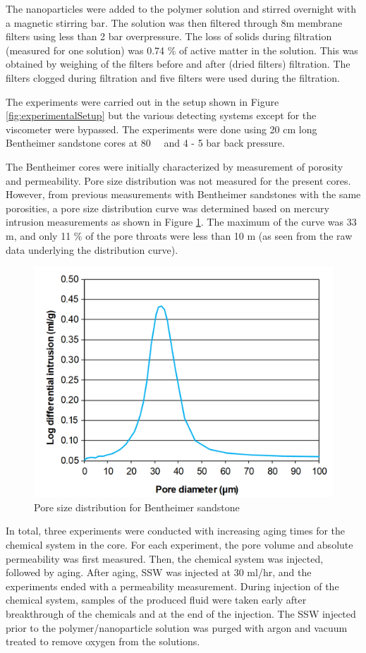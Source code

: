 The nanoparticles  were added to the polymer solution and stirred overnight with a magnetic stirring bar. The solution was then filtered through 8\micro m membrane filters using less than 2 bar overpressure. The loss of solids during filtration (measured for one solution) was 0.74 \% of active matter in the solution. This was obtained by weighing of the filters before and after (dried filters) filtration. The filters clogged during filtration and five filters were used during the filtration.

The experiments were carried out in the setup shown in Figure \ref{fig:experimentalSetup} but the various detecting systems except for the viscometer were bypassed. The experiments were done using 20 cm long Bentheimer sandstone cores at 80~\celsius~ and 4 - 5 bar back pressure.

The Bentheimer cores were initially characterized by measurement of porosity and permeability. Pore size distribution was not measured for the present cores. However, from previous measurements with Bentheimer sandstones with the same porosities, a pore size distribution curve was determined based on mercury intrusion measurements as shown in Figure \ref{cht:poreSizeDist}. The maximum of the curve was 33 \micro m, and only 11 \% of the pore throats were less than 10 \micro m (as seen from the raw data underlying the distribution curve).

\begin{figure}
    \centering
    \includegraphics[width=.7\textwidth]{img/cht/poreSizeDist.png}
    \caption{Pore size distribution for Bentheimer sandstone}
    \label{cht:poreSizeDist}
\end{figure}

In total, three experiments were conducted with increasing aging times for the chemical system in the core. For each experiment, the pore volume and absolute permeability was first measured. Then, the chemical system was injected, followed by aging. After aging, SSW was injected at 30 ml/hr, and the experiments ended with a permeability measurement. During injection of the chemical system, samples of the produced fluid were taken early after breakthrough of the chemicals and at the end of the injection.
The SSW injected prior to the polymer/nanoparticle solution was purged with argon and vacuum treated to remove oxygen from the solutions.
